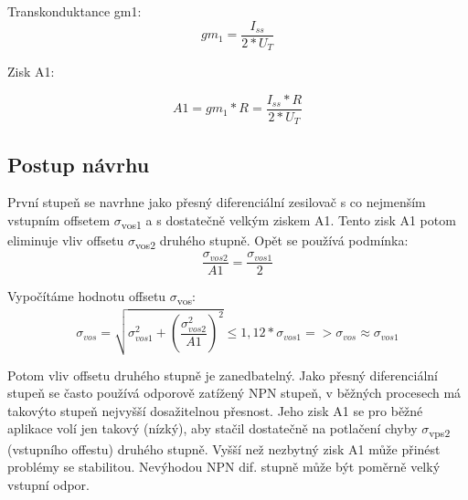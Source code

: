 Transkonduktance gm1:
\begin{equation}
gm_{1} = \frac{I_{ss}}{2*U_{T}}
\end{equation}

Zisk A1:

\begin{equation}
A1 = gm_{1}*R=\frac{I_{ss}*R}{2*U_{T}}
\end{equation}

\newpage
\subsection{Postup návrhu}

První stupeň se navrhne jako přesný diferenciální zesilovač s co nejmenším vstupním offsetem $\sigma$\textsubscript{vos1} a s dostatečně velkým ziskem A1. Tento zisk A1 potom eliminuje vliv offsetu $\sigma$\textsubscript{vos2} druhého stupně. Opět se používá podmínka:
\begin{equation}
\frac{\sigma_{vos2}}{A1} = \frac{\sigma_{vos1}}{2}
\end{equation}

Vypočítáme hodnotu offsetu $\sigma$\textsubscript{vos}:
\begin{equation}
\sigma_{vos} = \sqrt{\sigma_{vos1}^2+(\frac{\sigma_{vos2}^2}{A1})^2}\leqslant1,12*\sigma_{vos1}=> \sigma_{vos} \approx \sigma_{vos1}
\end{equation}

Potom vliv offsetu druhého stupně je zanedbatelný. Jako přesný diferenciální stupeň se často používá odporově zatížený NPN stupeň, v běžných procesech má takovýto stupeň nejvyšší dosažitelnou přesnost. Jeho zisk A1 se pro běžné aplikace volí jen takový (nízký), aby stačil dostatečně na potlačení chyby $\sigma$\textsubscript{vps2} (vstupního offestu) druhého stupně. Vyšší než nezbytný zisk A1 může přinést problémy se stabilitou. Nevýhodou NPN dif. stupně může být poměrně velký vstupní odpor.

